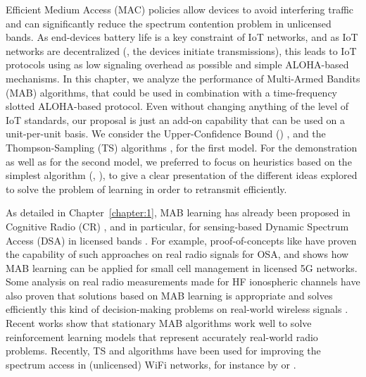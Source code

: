 Efficient Medium Access (MAC) policies allow devices to avoid interfering traffic and can significantly reduce the spectrum contention problem in unlicensed bands.
As end-devices battery life is a key constraint of IoT networks,
and as IoT networks are decentralized (\ie, the devices initiate transmissions),
this leads to IoT protocols using as low signaling overhead as possible and simple ALOHA-based mechanisms.
%
In this chapter, we analyze the performance of Multi-Armed Bandits (MAB) algorithms, that could be used in combination with a time-frequency slotted ALOHA-based protocol.
Even without changing anything of the level of IoT standards, our proposal is just an add-on capability that can be used on a unit-per-unit basis.
We consider the Upper-Confidence Bound (\UCB) \cite{Auer02}, and the Thompson-Sampling (TS) algorithms \cite{Thompson33,AgrawalGoyal11,
Kaufmann12Thompson}, for the first model. For the demonstration as well as for the second model, we preferred to focus on heuristics based on the simplest algorithm (\ie, \UCB), to give a clear presentation of the different ideas explored to solve the problem of learning in order to retransmit efficiently.

As detailed in Chapter~\ref{chapter:1},
MAB learning has already been proposed in Cognitive Radio (CR) \cite{Mitola99,Haykin05}, and in particular, for sensing-based Dynamic Spectrum Access (DSA) in licensed bands \cite{Jouini10}.
For example,
proof-of-concepts like \cite{kumar2016two} have proven the capability of such approaches on real radio signals for OSA,
and \cite{Maghsudi16} shows how MAB learning can be applied for small cell management in licensed 5G networks.
Some analysis on real radio measurements made for HF ionospheric channels have also proven that solutions based on MAB learning is appropriate and solves efficiently this kind of decision-making problems on real-world wireless signals \cite{Melian15}.
Recent works show that stationary MAB algorithms work well to solve reinforcement learning models that represent accurately real-world radio problems.
Recently, TS and \UCB{} algorithms have been used for improving the spectrum access in (unlicensed) WiFi networks, for instance by \cite{Toldov16} or \cite{Wilhelmi19collaborative,Wilhelmi19potential}.

